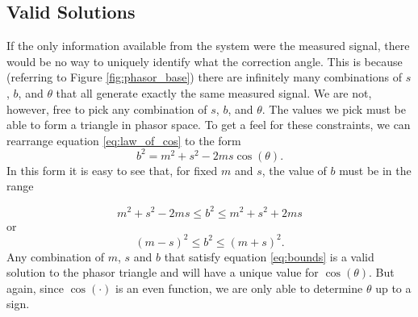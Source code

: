\documentclass[paper=a4, fontsize=11pt]{scrartcl}
\numberwithin{equation}{section}		%
\numberwithin{figure}{section}			%
\numberwithin{table}{section}				%
\begin{document}
\begin{appendices}
\subsection{Valid Solutions} \label{section:validity}
If the only information available from the system were the measured signal, there would be no way to uniquely identify what the correction angle.  This is because (referring to Figure \ref{fig:phasor_base}) there are infinitely many combinations of $s$, $b$, and $\theta$ that all generate exactly the same measured signal. We are not, however, free to pick any combination of $s$, $b$, and $\theta$.  The values we pick must be able to form a triangle in phasor space.  To get a feel for these constraints, we can rearrange equation \ref{eq:law_of_cos} to the form
\begin{equation}
    b^2 = m^2 + s^2 - 2 m s \cos\left(\theta\right).
\end{equation}
In this form it is easy to see that, for fixed $m$ and $s$, the value of $b$ must be in the range

\begin{equation*}
      m^2 + s^2 - 2 m s \leq b ^ 2 \leq  m^2 + s^2 + 2 m s
\end{equation*}
or
\begin{equation} \label{eq:bounds}
      \left(m-s\right)^2 \leq b ^ 2 \leq \left(m + s\right)^2.  
\end{equation}
Any combination of $m$, $s$ and $b$ that satisfy equation \ref{eq:bounds} is a valid solution to the phasor triangle and will have a unique value for $\cos\left(\theta\right)$.  But again, since $\cos\left(\cdot\right)$ is an even function, we are only able to determine $\theta$ up to a sign.
    

\end{appendices}
\end{document}
